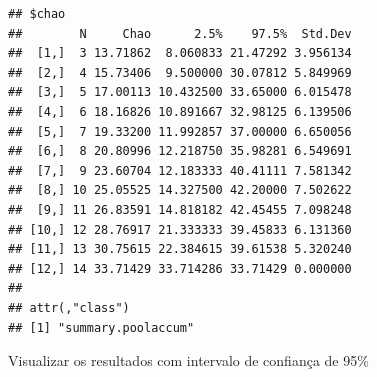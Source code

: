 \documentclass[
]{book}
\begin{document}
\begin{verbatim}
## $chao
##        N     Chao      2.5%    97.5%  Std.Dev
##  [1,]  3 13.71862  8.060833 21.47292 3.956134
##  [2,]  4 15.73406  9.500000 30.07812 5.849969
##  [3,]  5 17.00113 10.432500 33.65000 6.015478
##  [4,]  6 18.16826 10.891667 32.98125 6.139506
##  [5,]  7 19.33200 11.992857 37.00000 6.650056
##  [6,]  8 20.80996 12.218750 35.98281 6.549691
##  [7,]  9 23.60704 12.183333 40.41111 7.581342
##  [8,] 10 25.05525 14.327500 42.20000 7.502622
##  [9,] 11 26.83591 14.818182 42.45455 7.098248
## [10,] 12 28.76917 21.333333 39.45833 6.131360
## [11,] 13 30.75615 22.384615 39.61538 5.320240
## [12,] 14 33.71429 33.714286 33.71429 0.000000
## 
## attr(,"class")
## [1] "summary.poolaccum"
\end{verbatim}

Visualizar os resultados com intervalo de confiança de 95\%
\end{document}
